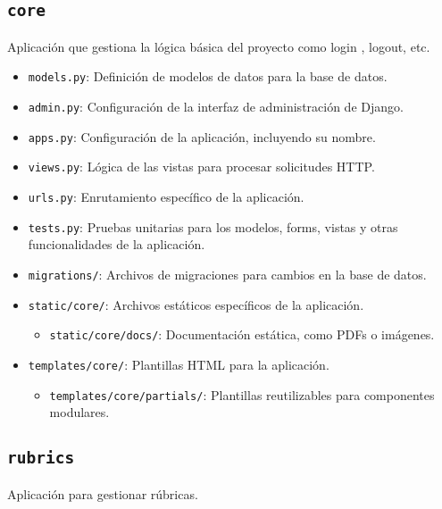 \subsection{\texttt{core}}
Aplicación que gestiona la lógica básica del proyecto como login , logout, etc. 

\begin{itemize}
    \item \texttt{models.py}: Definición de modelos de datos para la base de datos.
    \item \texttt{admin.py}: Configuración de la interfaz de administración de Django.
    \item \texttt{apps.py}: Configuración de la aplicación, incluyendo su nombre.
    \item \texttt{views.py}: Lógica de las vistas para procesar solicitudes HTTP.
    \item \texttt{urls.py}: Enrutamiento específico de la aplicación.
    \item \texttt{tests.py}: Pruebas unitarias para los modelos, forms, vistas y otras funcionalidades de la aplicación.
    \item \texttt{migrations/}: Archivos de migraciones para cambios en la base de datos.
    \item \texttt{static/core/}: Archivos estáticos específicos de la aplicación.
    \begin{itemize}
        \item \texttt{static/core/docs/}: Documentación estática, como PDFs o imágenes.
    \end{itemize}
    \item \texttt{templates/core/}: Plantillas HTML para la aplicación.
    \begin{itemize}
        \item \texttt{templates/core/partials/}: Plantillas reutilizables para componentes modulares.
    \end{itemize}
\end{itemize}

\subsection{\texttt{rubrics}}
Aplicación para gestionar rúbricas.

